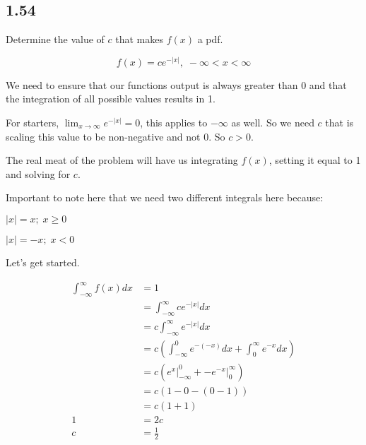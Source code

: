 \subsection*{1.54}

Determine the value of $c$ that makes $f(x)$ a pdf.

\[
	f(x) = ce^{-|x|}, \; -\infty < x < \infty
\]

We need to ensure that our functions output is always greater than 0 and that the integration of all possible values results in 1. 

For starters, $\lim_{x \to \infty} e^{-|x|} = 0$, this applies to $-\infty$ as well. So we need $c$ that is scaling this value to be non-negative and not 0. So $c > 0$.

The real meat of the problem will have us integrating $f(x)$, setting it equal to 1 and solving for $c$.

Important to note here that we need two different integrals here because:

$|x| = x; \; x \geq 0$

$|x| = -x; \; x < 0$

Let's get started.

\begin{align*}
	\int_{-\infty}^{\infty} f(x) dx &= 1 \\
	&= \int_{-\infty}^{\infty} ce^{-|x|} dx \\
	&= c \int_{-\infty}^{\infty} e^{-|x|} dx \\
	&= c \left( \int_{-\infty}^{0} e^{-(-x)} dx + \int_{0}^{\infty} e^{-x} dx  \right) \\
	&= c \left( e^x \rvert_{-\infty}^0 + - e^{-x} \rvert_{0}^{\infty} \right) \\
	&= c(1 - 0 - (0 - 1)) \\
	&= c(1+1) \\
	1 &= 2c \\
	c &= \frac{1}{2}
\end{align*}
